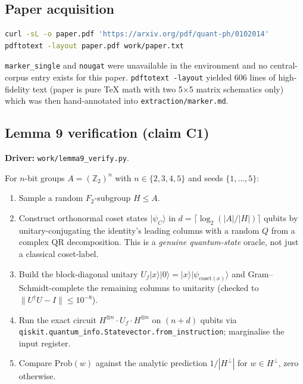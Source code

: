 \documentclass[11pt]{article}
\begin{document}
\subsection{Paper acquisition}

\begin{lstlisting}[language=bash]
curl -sL -o paper.pdf 'https://arxiv.org/pdf/quant-ph/0102014'
pdftotext -layout paper.pdf work/paper.txt
\end{lstlisting}

\texttt{marker\_single} and \texttt{nougat} were unavailable in the
environment and no central-corpus entry exists for this paper.
\texttt{pdftotext -layout} yielded 606 lines of high-fidelity text (paper
is pure TeX math with two 5$\times$5 matrix schematics only) which was
then hand-annotated into \texttt{extraction/marker.md}.

\subsection{Lemma 9 verification (claim C1)}

\textbf{Driver:} \texttt{work/lemma9\_verify.py}.

For $n$-bit groups $A = (\mathbb{Z}_2)^n$ with $n \in \{2,3,4,5\}$ and
seeds $\{1,\ldots,5\}$:
\begin{enumerate}
  \item Sample a random $F_2$-subgroup $H \le A$.
  \item Construct orthonormal coset states $\lvert\psi_C\rangle$ in
        $d = \lceil\log_2(|A|/|H|)\rceil$ qubits by unitary-conjugating the
        identity's leading columns with a random $Q$ from a complex
        QR decomposition. This is a \emph{genuine quantum-state} oracle,
        not just a classical coset-label.
  \item Build the block-diagonal unitary $U_f \lvert x\rangle\lvert 0\rangle
        = \lvert x\rangle\lvert\psi_{\mathrm{coset}(x)}\rangle$ and
        Gram--Schmidt-complete the remaining columns to unitarity
        (checked to $\lVert U^\dagger U - I \rVert \le 10^{-8}$).
  \item Run the exact circuit
        $H^{\otimes n} \cdot U_f \cdot H^{\otimes n}$ on
        $(n + d)$ qubits via
        \texttt{qiskit.quantum\_info.Statevector.from\_instruction};
        marginalise the input register.
  \item Compare $\mathrm{Prob}(w)$ against the analytic prediction
        $1/|H^\perp|$ for $w \in H^\perp$, zero otherwise.
\end{enumerate}
\end{document}
